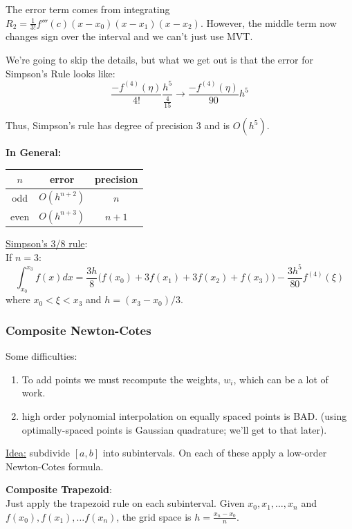 \documentclass[12pt]{article}
\begin{document}
The error term comes from integrating $R_2 = \frac{1}{3!}f'''(c)(x-x_0)(x-x_1)(x-x_2)$. However, the middle term now changes sign over the interval and we can't just use MVT.

We're going to skip the details, but what we get out is that the error for Simpson's Rule looks like:
\[\frac{-f^{(4)}(\eta)}{4!}\frac{h^5}{\frac{4}{15}} \rightarrow \boxed{\frac{-f^{(4)}(\eta)}{90}h^5}\]

Thus, Simpson's rule has degree of precision 3 and is $O(h^5)$.

\textbf{In General:}
\vspace*{-1em}
\begin{center}
\begin{tabular}{c c c}
$n$  & error        & precision \\ \hline
odd  & $O(h^{n+2})$ & $n$ \\
even & $O(h^{n+3})$ & $n+1$ \\
\end{tabular}
\end{center}

\underline{Simpson's 3/8 rule}:\\
If $n=3$:
\[\int_{x_0}^{x_3} f(x)dx = \frac{3h}{8}\bigl(f(x_0) + 3f(x_1) + 3f(x_2) + f(x_3)\bigr) - \frac{3h^5}{80}f^{(4)}(\xi)\]
where $x_0 < \xi < x_3$ and $h=(x_3 - x_0)/3$.

\subsubsection*{Composite Newton-Cotes}
Some difficulties:
\begin{enumerate}
\item To add points we must recompute the weights, $w_i$, which can be a lot of work.
\item high order polynomial interpolation on equally spaced points is BAD. (using optimally-spaced points is Gaussian quadrature; we'll get to that later).
\end{enumerate}

\underline{Idea:} subdivide $[a,b]$ into subintervals. On each of these apply a low-order Newton-Cotes formula.

\textbf{Composite Trapezoid}:\\
Just apply the trapezoid rule on each subinterval. Given $x_0, x_1, \dots, x_n$ and $f(x_0), f(x_1), \dots f(x_n)$, the grid space is $h = \frac{x_n-x_0}{n}$.
\end{document}
